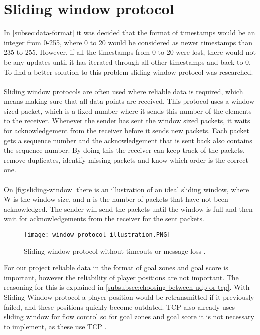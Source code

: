 \section{Sliding window protocol}
In \autoref{subsec:data-format} it was decided that the format of timestamps would be an integer from 0-255, where 0 to 20 would be considered as newer timestamps than 235 to 255.
However, if all the timestamps from 0 to 20 were lost, there would not be any updates until it has iterated through all other timestamps and back to 0.
To find a better solution to this problem sliding window protocol was researched.
\\\\
Sliding window protocols are often used where reliable data is required, which means making sure that all data points are received.
This protocol uses a window sized packet, which is a fixed number where it sends this number of the elements to the receiver.
Whenever the sender has sent the window sized packets, it waits for acknowledgement from the receiver before it sends new packets.
Each packet gets a sequence number and the acknowledgement that is sent back also contains the sequence number.
By doing this the receiver can keep track of the packets, remove duplicates, identify missing packets and know which order is the correct one.
\\\\
On \autoref{fig:sliding-window} there is an illustration of an ideal sliding window, where W is the window size, and n is the number of packets that have not been acknowledged.
The sender will send the packets until the window is full and then wait for acknowledgements from the receiver for the sent packets.
\begin{figure}[H]
    \centering
    \texttt{[image: window-protocol-illustration.PNG]}
    \caption{Sliding window protocol without timeouts or message loss \cite{design-and-validation-of-computer-protocols}.}
    \label{fig:sliding-window}
\end{figure}
\noindent
For our project reliable data in the format of goal zones and goal score is important, however the reliability of player positions are not important.
The reasoning for this is explained in \autoref{subsubsec:choosing-between-udp-or-tcp}.
With Sliding Window protocol a player position would be retransmitted if it previously failed, and these positions quickly become outdated.
TCP also already uses sliding window for flow control so for goal zones and goal score it is not necessary to implement, as these use TCP \cite{ibm:sliding-window}.
